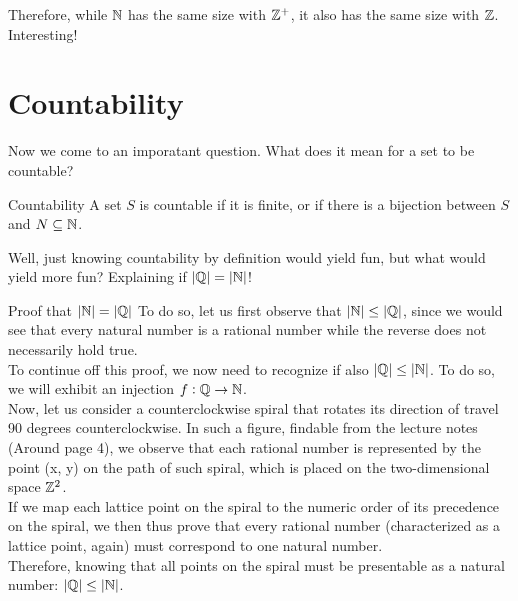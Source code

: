 Therefore, while $\mathbb{N}$ has the same size with $\mathbb{Z}^+$, it also has the same size with $\mathbb{Z}$. Interesting!

\section{Countability}
Now we come to an imporatant question. What does it mean for a set to be countable? 
\begin{ln-define}{Countability}{}
    A set $S$ is countable if it is finite, or if there is a bijection between $S$ and $N \subseteq \mathbb{N}$.
\end{ln-define}

Well, just knowing countability by definition would yield fun, but what would yield more fun? Explaining if $|\mathbb{Q}| = |\mathbb{N}|$!
\begin{ln-theorem}{Proof that $|\mathbb{N}| = |\mathbb{Q}|$}{}
    To do so, let us first observe that $|\mathbb{N}| \leq |\mathbb{Q}|$, since we would see that every natural number is a rational number while the reverse does not necessarily hold true. \\
    
    To continue off this proof, we now need to recognize if also $|\mathbb{Q}| \leq |\mathbb{N}|$. To do so, we will exhibit an injection $f: \mathbb{Q} \rightarrow \mathbb{N}$. \\
    Now, let us consider a counterclockwise spiral that rotates its direction of travel 90 degrees counterclockwise. In such a figure, findable from the lecture notes (Around page 4), we observe that each rational number is represented by the point (x, y) on the path of such spiral, which is placed on the two-dimensional space $\mathbb{Z}^2$. \\
    If we map each lattice point on the spiral to the numeric order of its precedence on the spiral, we then thus prove that every rational number (characterized as a lattice point, again) must correspond to one natural number. \\
    Therefore, knowing that all points on the spiral must be presentable as a natural number: $|\mathbb{Q}| \leq |\mathbb{N}|$.
\end{ln-theorem}

